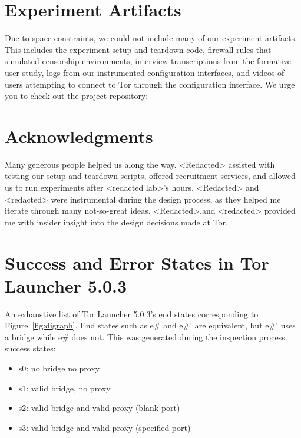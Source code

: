 \documentclass[USenglish,oneside,twocolumn]{article}
\begin{document}
\section {Experiment Artifacts} 
Due to space constraints, we could not include many of our experiment artifacts. This includes the experiment setup and teardown code, firewall rules that simulated censorship environments, interview transcriptions from the formative user study, logs from our instrumented configuration interfaces, and videos of users attempting to connect to Tor through the configuration interface. We urge you to check out the project repository: \\


\section {Acknowledgments}
Many generous people helped us along the way. <Redacted> assisted with testing our setup and teardown scripts, offered recruitment services, and allowed us to run experiments after <redacted lab>'s hours. <Redacted> and <redacted> were instrumental during the design process, as they helped me iterate through many not-so-great ideas.  <Redacted>,and <redacted> provided me with insider insight into the design decisions made at Tor.




\appendix

\section{Success and Error States in Tor Launcher 5.0.3} 
\label{states} 
An exhaustive list of Tor Launcher 5.0.3's end states corresponding to Figure~\ref{fig:digraph}. End states such as e\# and e\#' are equivalent, but e\#' uses a bridge while e\# does not. This was generated during the inspection process.\\

\noindent success states: 
\begin{itemize}
\item s0: no bridge no proxy
\item s1: valid bridge, no proxy
\item s2: valid bridge and valid proxy (blank port)
\item s3: valid bridge and valid proxy (specified port)
\end{itemize}
\end{document}
